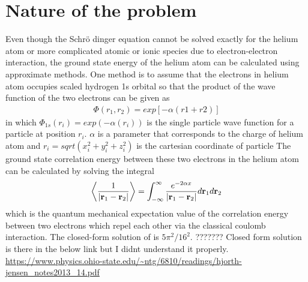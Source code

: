\section{Nature of the problem}
\label{sec:NatureOfTheProblem}
Even though the Schr\"{o} dinger equation cannot be solved exactly for the helium atom or more complicated atomic or ionic species due to  electron-electron interaction, the ground state energy of the helium atom can be calculated using approximate methods. 
One method is to assume that the electrons in helium atom occupies scaled hydrogen 1s orbital so that the product of the wave function of the two electrons can be given as
\begin{align}
	\Phi (r_1, r_2 ) = exp[-\alpha ( r1+ r2)]
	\label{eq:NatureOfTheProblem1}
\end{align}
in which $\Phi_{1s}(r_i) = exp(-\alpha ( r_i))$ is the single particle wave function for a particle at position $r_i$.
$\alpha$ is a parameter that corresponds to the charge of helium atom and 
$r_i = sqrt(x_i^2+y_i^2+z_i^2)$ 
is the cartesian coordinate of particle
The ground state correlation energy between these two electrons in the helium atom can be calculated by solving the integral
\begin{align}
	\left< \frac{1}{| \mbox{\textbf{r}}_1 - \mbox{\textbf{r}}_2 |} \right> 
   = \int _{-\infty } ^{\infty } \frac{e^{-2\alpha x}}{| \mbox{\textbf{r}}_1 - \mbox{\textbf{r}}_2 |} d \mbox{\textbf{r}}_1 d\mbox{\textbf{r}}_2
   \label{eq:NatureOfTheProblem2}
\end{align}
which is the quantum mechanical expectation value of the correlation energy between two electrons which repel each other via the classical coulomb interaction.
The closed-form solution of  is $5\pi ^2 / 16^2$.
??????? Closed form solution is there in the below link but I didnt understand it properly.
\url{https://www.physics.ohio-state.edu/~ntg/6810/readings/hjorth-jensen_notes2013_14.pdf}


